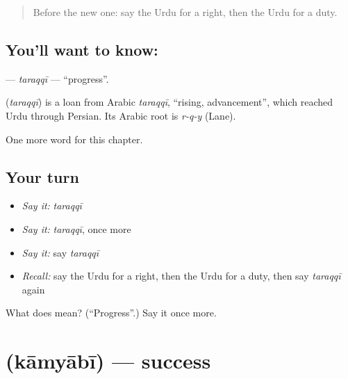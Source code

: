 \label{lesson:UR-C205-taraqqi}



\begin{quote}
Before the new one: say the Urdu for a right, then the Urdu for a duty.
\end{quote}

\subsection*{You'll want to know: }
\textbf{} — \emph{taraqqī} — \textquotedblleft{}progress\textquotedblright{}.

\begin{cousinweb}
\textbf{} (\emph{taraqqī}) is a loan from Arabic \emph{taraqqī}, \textquotedblleft{}rising, advancement\textquotedblright{}, which reached Urdu through Persian. Its Arabic root is \emph{r-q-y} (Lane).
\end{cousinweb}

\begin{grammarlens}[title={What you've built}]
One more word for this chapter.
\end{grammarlens}

\subsection*{Your turn}
\begin{itemize}
\raggedright
  \item \emph{Say it:} \emph{taraqqī}
  \item \emph{Say it:} \emph{taraqqī}, once more
  \item \emph{Say it:} say \emph{taraqqī}
  \item \emph{Recall:} say the Urdu for a right, then the Urdu for a duty, then say \emph{taraqqī} again
\end{itemize}

\begin{tcolorbox}[breakable,colback=teal!4,colframe=teal!35!black,title={Before you move on}]
What does  mean? (\textquotedblleft{}Progress\textquotedblright{}.) Say it once more.
\end{tcolorbox}
\section[\texorpdfstring{\ur{کامیابی} (kāmyābī)}{کامیابی (kāmyābī)}]{ (kāmyābī) — success}

\label{lesson:UR-C205-kamyabi}



